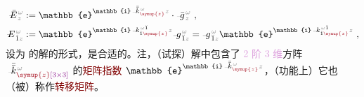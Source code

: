 \begin{subequations} \label{eq:matrix_exp}
\begin{align}
	\xint{\mathcolor{gray}{-}}{30}{\bar{E}}^{\;\!\mathcolor{gray}{\omega}}_{\;\! \mathcolor{gray}{z}} &:= \mathbb{e}^{\mathbb{i} \xint{\begin{smallmatrix} ~ \\ {}^{}_{\mathcolor{gray}{-}} \\ ~ \end{smallmatrix}}{15}{\bar{\bar{k}}}_{\textcolor{Maroon}{\symup{z}}}^{\;\! \mathcolor{gray}{\omega}} \mathcolor{gray}{z}} \cdot \xint{{}^{}_{\mathcolor{gray}{-}}}{10}{\bar{g}}^{\;\!\mathcolor{gray}{\omega}}_{\;\! \mathcolor{gray}{z}} ~, \label{eq:vec-matrix_exp} \\
	\xint{\mathcolor{gray}{-}}{30}{E}^{\;\!\mathcolor{gray}{\omega}}_{\;\! \hat{1} \mathcolor{gray}{z}} &:= \mathbb{e}^{\mathbb{i} \xint{\begin{smallmatrix} ~ \\ {}^{}_{\mathcolor{gray}{-}} \\ ~ \end{smallmatrix}}{15}{k}_{\hat{1} \textcolor{Maroon}{\symup{z}}}^{\;\! \mathcolor{gray}{\omega} \breve{1}} \mathcolor{gray}{z}} \xint{{}^{}_{\mathcolor{gray}{-}}}{10}{g}^{\;\!\mathcolor{gray}{\omega}}_{\;\! \breve{1} \mathcolor{gray}{z}} = \xint{{}^{}_{\mathcolor{gray}{-}}}{10}{g}^{\;\!\mathcolor{gray}{\omega}}_{\;\! \breve{1} \mathcolor{gray}{z}} \mathbb{e}^{\mathbb{i} \xint{\begin{smallmatrix} ~ \\ {}^{}_{\mathcolor{gray}{-}} \\ ~ \end{smallmatrix}}{15}{k}_{\hat{1} \textcolor{Maroon}{\symup{z}}}^{\;\! \mathcolor{gray}{\omega} \breve{1}} \mathcolor{gray}{z}} ~, \label{eq:components-matrix_exp}
\end{align}
\end{subequations}
设为  的解的形式，是合适的\cite{xieAnalytic3DVector}。注，（试探）解中包含了 \textcolor{Plum}{2 阶 3 维}方阵 $\xint{\begin{smallmatrix} ~ \\ {}^{}_{\mathcolor{gray}{-}} \\ ~ \end{smallmatrix}}{15}{\bar{\bar{k}}}_{\textcolor{Maroon}{\symup{z}}\textcolor{Plum}{\left[3 \times 3\right]}}^{\;\! \mathcolor{gray}{\omega}}$ 的\textcolor{Maroon}{矩阵指数} $\mathbb{e}^{\mathbb{i} \xint{\begin{smallmatrix} ~ \\ {}^{}_{\mathcolor{gray}{-}} \\ ~ \end{smallmatrix}}{15}{\bar{\bar{k}}}_{\textcolor{Maroon}{\symup{z}}}^{\;\! \mathcolor{gray}{\omega}} \mathcolor{gray}{z}}$\cite{pessoaAvoidingMatrixExponentials2024,molerNineteenDubiousWays2003}，（功能上）它也（被）称作\textcolor{Maroon}{转移矩阵}。

